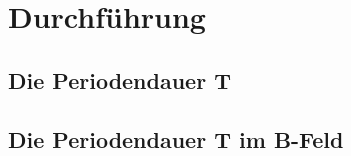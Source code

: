 \newpage
\section{Durchführung}
\label{sec:Durchfuehrung} %
\subsection{Die Periodendauer T}
\subsection{Die Periodendauer T im B-Feld}

